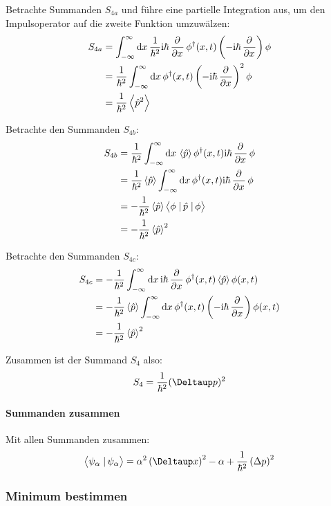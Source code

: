 Betrachte Summanden $S_{4a}$ und führe eine partielle Integration aus, um den
Impulsoperator auf die zweite Funktion umzuwälzen:
\begin{align*}
	S_{4a}
	&= \int_{-\infty}^\infty \dif x \, \frac{1}{\hbar^2} \ii \hbar \dpd{}x \phi^\dagger(x, t) \del{- \ii \hbar \dpd{}x} \phi \\
	&= \frac{1}{\hbar^2} \int_{-\infty}^\infty \dif x \, \phi^\dagger(x, t) \del{- \ii \hbar \dpd{}x}^2 \phi \\
	&= \frac{1}{\hbar^2} \bracket{\hat p^2}
\end{align*}

Betrachte den Summanden $S_{4b}$:
\begin{align*}
	S_{4b}
	&= \frac{1}{\hbar^2} \int_{-\infty}^\infty \dif x \, \bracket{\hat p} \phi^\dagger(x, t) \ii \hbar \dpd{}x \phi \\
	&= \frac{1}{\hbar^2} \bracket{\hat p} \int_{-\infty}^\infty \dif x \, \phi^\dagger(x, t) \ii \hbar \dpd{}x \phi \\
	&= - \frac{1}{\hbar^2} \bracket{\hat p} \braproket\phi{\hat p}\phi \\
	&= - \frac{1}{\hbar^2} \bracket{\hat p}^2
\end{align*}

Betrachte den Summanden $S_{4c}$:
\begin{align*}
	S_{4c}
	&= - \frac{1}{\hbar^2} \int_{-\infty}^\infty \dif x \, \ii \hbar \dpd{}x \phi^\dagger(x, t) \bracket{\hat p} \phi(x, t) \\
	&= - \frac{1}{\hbar^2} \bracket{\hat p} \int_{-\infty}^\infty \dif x \, \phi^\dagger(x, t) \del{- \ii \hbar \dpd{}x} \phi(x, t) \\
	&= - \frac{1}{\hbar^2} \bracket{\hat p}^2
\end{align*}

Zusammen ist der Summand $S_4$ also:
\[
	S_4 = \frac{1}{\hbar^2} (\Deltaup p)^2 
\]

\paragraph{Summanden zusammen}

Mit allen Summanden zusammen:
\[
	\braket{\psi_\alpha}{\psi_\alpha}
	= \alpha^2 \del{\Deltaup x}^2 - \alpha + \frac{1}{\hbar^2} \del{\Delta p}^2
\]

\subsubsection{Minimum bestimmen}


